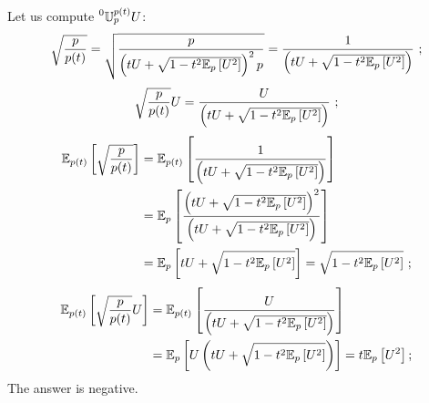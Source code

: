\documentclass[12pt,a4paper]{amsart}
\begin{document}
\begin{exercise}
Let us compute $\prescript{0}{}{\mathbb U}_{p}^{p(t)} U$:
%
\begin{equation*}
 \sqrt{\frac{p}{p(t)}} = \sqrt{\frac{p}{\left(tU + \sqrt{1 - t^2 \expectat p {U^2}}\right)^2 p}} = \frac{1}{\left(tU + \sqrt{1 - t^2 \expectat p {U^2}}\right)} \ ;
\end{equation*}
%
\begin{equation*}
 \sqrt{\frac{p}{p(t)}} U = \frac{U}{\left(tU + \sqrt{1 - t^2 \expectat p {U^2}}\right)} \ ;
\end{equation*}
%
\begin{align*}
{\operatorname{\mathbb E}}_{p(t)}\left[\sqrt{\frac{p}{p(t)}}\right] &= {\operatorname{\mathbb E}}_{p(t)}\left[\frac{1}{\left(tU + \sqrt{1 - t^2 {\operatorname{\mathbb E}}_{p}\left[U^2\right]}\right)}\right] \\
 &= {\operatorname{\mathbb E}}_{p}\left[\frac{\left(tU + \sqrt{1 - t^2 {\operatorname{\mathbb E}}_{p}\left[U^2\right]}\right)^2}{\left(tU + \sqrt{1 - t^2 {\operatorname{\mathbb E}}_{p}\left[U^2\right]}\right)}\right]  \\
 &= {\operatorname{\mathbb E}}_{p}\left[tU + \sqrt{1 - t^2 {\operatorname{\mathbb E}}_{p}\left[U^2\right]}\right] = \sqrt{1 - t^2 {\operatorname{\mathbb E}}_{p}\left[U^2\right]} \ ; \\
\end{align*}
%
\begin{align*}
{\operatorname{\mathbb E}}_{p(t)}\left[\sqrt{\frac{p}{p(t)}}U\right] &= {\operatorname{\mathbb E}}_{p(t)}\left[\frac{U}{\left(tU + \sqrt{1 - t^2 {\operatorname{\mathbb E}}_{p}\left[U^2\right]}\right)}\right] \\
 &= {\operatorname{\mathbb E}}_{p}\left[U\left(tU + \sqrt{1 - t^2 {\operatorname{\mathbb E}}_{p}\left[U^2\right]}\right)\right] = t{\operatorname{\mathbb E}}_{p}\left[U^2\right] ; \\
\end{align*}
%
The answer is negative.
  \end{exercise}
\end{document}
